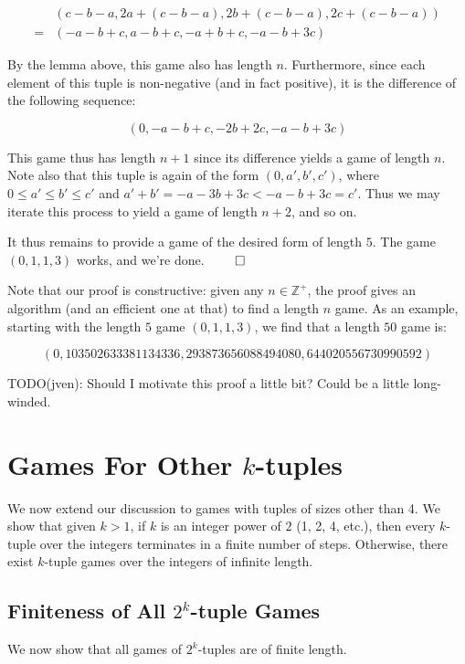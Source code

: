 \documentclass[12pt]{amsart}
\newcommand{\zp}{\mathbb{Z}^+}
\begin{document}
$$\begin{array}{cl}
& (c - b - a, 2a + (c - b - a), 2b + (c - b - a), 2c + (c - b - a)) \\
= & (-a - b + c, a - b + c, -a + b + c, -a - b + 3c)
\end{array}$$

By the lemma above, this game also has length $n$. Furthermore, since each element of this tuple is non-negative (and in fact positive), it is the difference of the following sequence:

$$(0, -a - b + c, -2b + 2c, -a - b + 3c)$$

This game thus has length $n + 1$ since its difference yields a game of length $n$. Note also that this tuple is again of the form $(0, a', b', c')$, where $0\leq a'\leq b'\leq c'$ and $a' + b' = -a - 3b + 3c < -a - b + 3c = c'$. Thus we may iterate this process to yield a game of length $n + 2$, and so on.

It thus remains to provide a game of the desired form of length $5$. The game $(0, 1, 1, 3)$ works, and we're done. $\qed$

Note that our proof is constructive: given any $n\in \zp$, the proof gives an algorithm (and an efficient one at that) to find a length $n$ game. As an example, starting with the length $5$ game $(0, 1, 1, 3)$, we find that a length $50$ game is:

$$(0, 103502633381134336, 293873656088494080, 644020556730990592)$$

TODO(jven): Should I motivate this proof a little bit? Could be a little long-winded.

\section{Games For Other $k$-tuples\label{sec:othertuples}}

We now extend our discussion to games with tuples of sizes other than 4. We show that given $k >1$, if $k$ is an integer power of $2$ (1, 2, 4, etc.), then every $k$-tuple over the integers terminates in a finite number of steps. Otherwise, there exist $k$-tuple games over the integers of infinite length.

\subsection{Finiteness of All $2^k$-tuple Games}

We now show that all games of $2^k$-tuples are of finite length.
\end{document}
